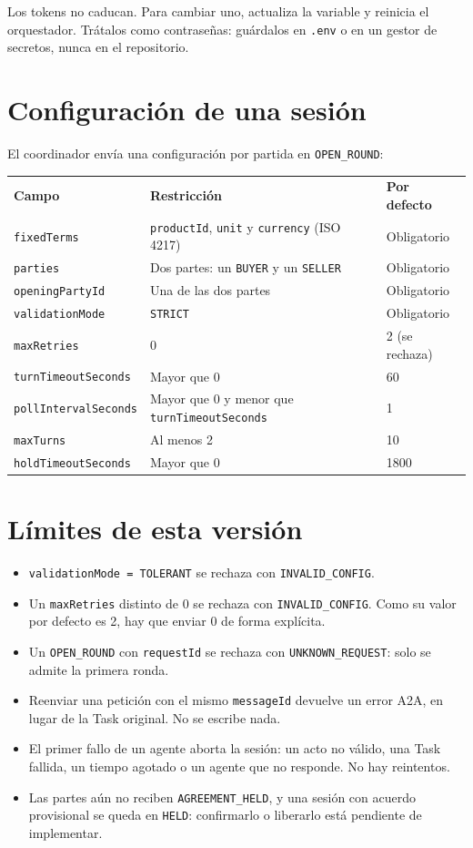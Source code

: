 Los tokens no caducan. Para cambiar uno, actualiza la variable y reinicia el orquestador. Trátalos como contraseñas: guárdalos en \texttt{.env} o en un gestor de secretos, nunca en el repositorio.

\section{Configuración de una sesión}

El coordinador envía una configuración por partida en \texttt{OPEN\_ROUND}:

\begin{tabular}{lp{5cm}l}
  \textbf{Campo} & \textbf{Restricción} & \textbf{Por defecto} \\
  \texttt{fixedTerms} & \texttt{productId}, \texttt{unit} y \texttt{currency} (ISO 4217) & Obligatorio \\
  \texttt{parties} & Dos partes: un \texttt{BUYER} y un \texttt{SELLER} & Obligatorio \\
  \texttt{openingPartyId} & Una de las dos partes & Obligatorio \\
  \texttt{validationMode} & \texttt{STRICT} & Obligatorio \\
  \texttt{maxRetries} & 0 & 2 (se rechaza) \\
  \texttt{turnTimeoutSeconds} & Mayor que 0 & 60 \\
  \texttt{pollIntervalSeconds} & Mayor que 0 y menor que \texttt{turnTimeoutSeconds} & 1 \\
  \texttt{maxTurns} & Al menos 2 & 10 \\
  \texttt{holdTimeoutSeconds} & Mayor que 0 & 1800 \\
\end{tabular}

\section{Límites de esta versión}

\begin{itemize}
  \item \texttt{validationMode = TOLERANT} se rechaza con \texttt{INVALID\_CONFIG}.
  \item Un \texttt{maxRetries} distinto de 0 se rechaza con \texttt{INVALID\_CONFIG}. Como su valor por defecto es 2, hay que enviar 0 de forma explícita.
  \item Un \texttt{OPEN\_ROUND} con \texttt{requestId} se rechaza con \texttt{UNKNOWN\_REQUEST}: solo se admite la primera ronda.
  \item Reenviar una petición con el mismo \texttt{messageId} devuelve un error A2A, en lugar de la Task original. No se escribe nada.
  \item El primer fallo de un agente aborta la sesión: un acto no válido, una Task fallida, un tiempo agotado o un agente que no responde. No hay reintentos.
  \item Las partes aún no reciben \texttt{AGREEMENT\_HELD}, y una sesión con acuerdo provisional se queda en \texttt{HELD}: confirmarlo o liberarlo está pendiente de implementar.
\end{itemize}

